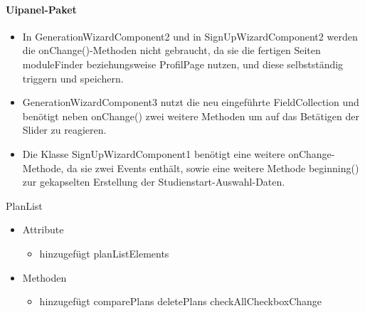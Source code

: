 \paragraph{Uipanel-Paket} 
\begin{itemize}
\item In GenerationWizardComponent2 und in SignUpWizardComponent2 werden die onChange()-Methoden nicht gebraucht, da sie die fertigen Seiten moduleFinder beziehungsweise ProfilPage nutzen, und diese selbstständig triggern und speichern. 
\item GenerationWizardComponent3 nutzt die neu eingeführte FieldCollection und benötigt neben onChange() zwei weitere Methoden um auf das Betätigen der Slider zu reagieren.
\item Die Klasse SignUpWizardComponent1 benötigt eine weitere onChange-Methode, da sie zwei Events enthält, sowie eine weitere  Methode beginning() zur gekapselten Erstellung der Studienstart-Auswahl-Daten.
\end{itemize}

PlanList
	\begin{itemize}
		\item Attribute		
		\begin{itemize}
			\item hinzugefügt
				\subitem planListElements
		\end{itemize}
		\item Methoden
		\begin{itemize}
			\item hinzugefügt
				\subitem comparePlans
				\subitem deletePlans
				\subitem checkAllCheckboxChange
		\end{itemize}
	\end{itemize}